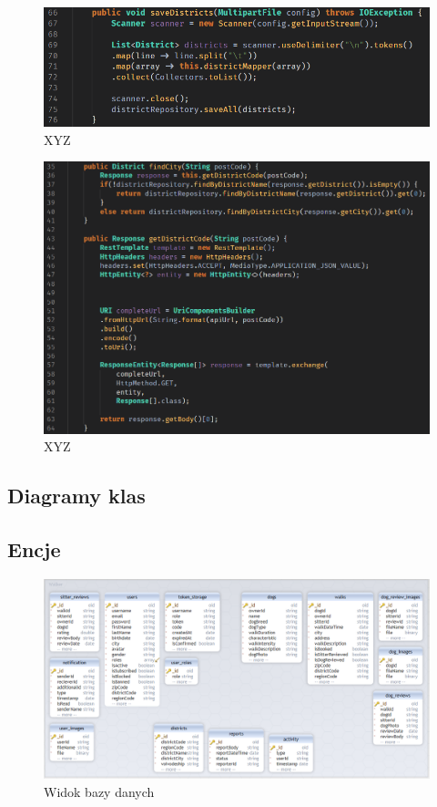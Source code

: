 \begin{figure}[H]
  \centering
  \includegraphics[width=1\linewidth]{rysunki/save.PNG}
  \caption{XYZ}
  \label{fig:xyz}
\end{figure}
\begin{figure}[H]
  \centering
  \includegraphics[width=1\linewidth]{rysunki/get-dist.PNG}
  \caption{XYZ}
  \label{fig:xyz}
\end{figure}

\subsection{Diagramy klas}

\subsection{Encje}
\begin{figure}[H]
  \centering
  \includegraphics[width=1\linewidth]{rysunki/database.PNG}
  \caption{Widok bazy danych}
  \label{fig:database}
\end{figure}  

